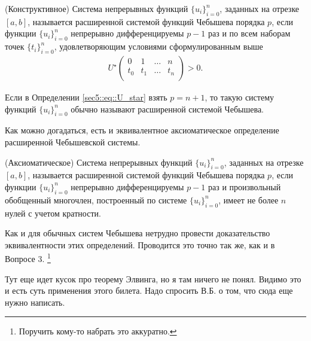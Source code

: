 \begin{dfn}(Конструктивное)
    \label{def::ChebExtendedP}
    Система непрерывных функций $\{u_i\}_{i = 0}^n$, заданных на отрезке $[a, b]$, называется расширенной системой функций Чебышева порядка $p$, если
    функции $\{u_i\}_{i = 0}^n$ непрерывно дифференцируемы $p - 1$ раз и по всем наборам точек $\{t_i\}_{i=0}^n$, удовлетворяющим условиями сформулированным выше
\begin{gather}
    U^\star \left(
    \begin{array}{cccc}
        0 & 1 & … & n \\
        t_0 & t_1 & … & t_n\\
    \end{array}  \right) > 0.
\end{gather}
\end{dfn}

Если в Определении \ref{sec5::eq::U_star} взять $p = n + 1$, то такую систему функций $\{u_i\}_{i = 0}^n$ обычно называют расширенной системой Чебышева.

Как можно догадаться, есть и эквивалентное аксиоматическое определение расширенной Чебышевской системы.

\begin{dfn}(Аксиоматическое)
    \label{def::ChebExtendedP2}
    Система непрерывных функций $\{u_i\}_{i = 0}^n$, заданных на отрезке $[a, b]$, называется расширенной системой функций Чебышева порядка $p$, если
    функции $\{u_i\}_{i = 0}^n$ непрерывно дифференцируемы $p - 1$ раз и произвольный обобщенный многочлен, построенный по системе $\{u_i\}_{i = 0}^n$,
    имеет не более $n$ нулей с учетом кратности.
\end{dfn}

Как и для обычных систем Чебышева нетрудно провести доказательство эквивалентности этих определений. Проводится это точно так же, как и в Вопросе 3.
\footnote{\color{blue} Поручить кому-то набрать это аккуратно.}

{\color{blue} Тут еще идет кусок про теорему Элвинга, но я там ничего не понял. Видимо это и есть суть применения этого билета. Надо спросить В.Б. о том, что сюда еще нужно написать.}

